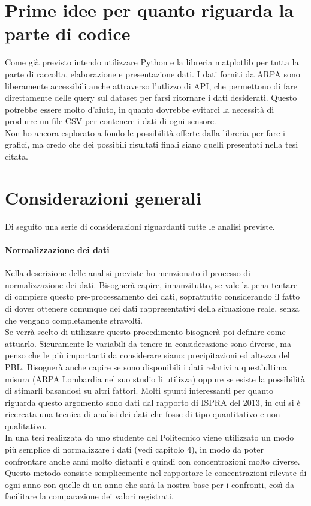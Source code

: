 \documentclass{article}
\begin{document}
\section{Prime idee per quanto riguarda la parte di codice}
Come già previsto intendo utilizzare Python e la libreria matplotlib per tutta la parte di raccolta, elaborazione e presentazione dati. I dati forniti da ARPA sono liberamente accessibili anche attraverso l'utlizzo di API, che permettono di fare direttamente delle query sul dataset per farsi ritornare i dati desiderati. Questo potrebbe essere molto d'aiuto, in quanto dovrebbe evitarci la necessità di produrre un file CSV per contenere i dati di ogni sensore.
\\Non ho ancora esplorato a fondo le possibilità offerte dalla libreria per fare i grafici, ma credo che dei possibili risultati finali siano quelli presentati nella tesi citata\cite{scolari2017evoluzione}.
\newpage

\section{Considerazioni generali}
Di seguito una serie di considerazioni riguardanti tutte le analisi previste.
\paragraph{Normalizzazione dei dati}
Nella descrizione delle analisi previste ho menzionato il processo di normalizzazione dei dati. Bisognerà capire, innanzitutto, se vale la pena tentare di compiere questo pre-processamento dei dati, soprattutto considerando il fatto di dover ottenere comunque dei dati rappresentativi della situazione reale, senza che vengano completamente stravolti. 
\\Se verrà scelto di utilizzare questo procedimento bisognerà poi definire come attuarlo. Sicuramente le variabili da tenere in considerazione sono diverse, ma penso che le più importanti da considerare siano: precipitazioni ed altezza del PBL. Bisognerà anche capire se sono disponibili i dati relativi a quest'ultima misura (ARPA Lombardia nel suo studio\cite{arpaCovid} li utilizza) oppure se esiste la possibilità di stimarli basandosi su altri fattori. Molti spunti interessanti per quanto riguarda questo argomento sono dati dal rapporto di ISPRA del 2013\cite{cattani2014analisi}, in cui si è ricercata una tecnica di analisi dei dati che fosse di tipo quantitativo e non qualitativo.
\\In una tesi realizzata da uno studente del Politecnico \cite{scolari2017evoluzione} viene utilizzato un modo più semplice di normalizzare i dati (vedi capitolo 4), in modo da poter confrontare anche anni molto distanti e quindi con concentrazioni molto diverse. Questo metodo consiste semplicemente nel rapportare le concentrazioni rilevate di ogni anno con quelle di un anno che sarà la nostra base per i confronti, così da facilitare la comparazione dei valori registrati. 
\end{document}

